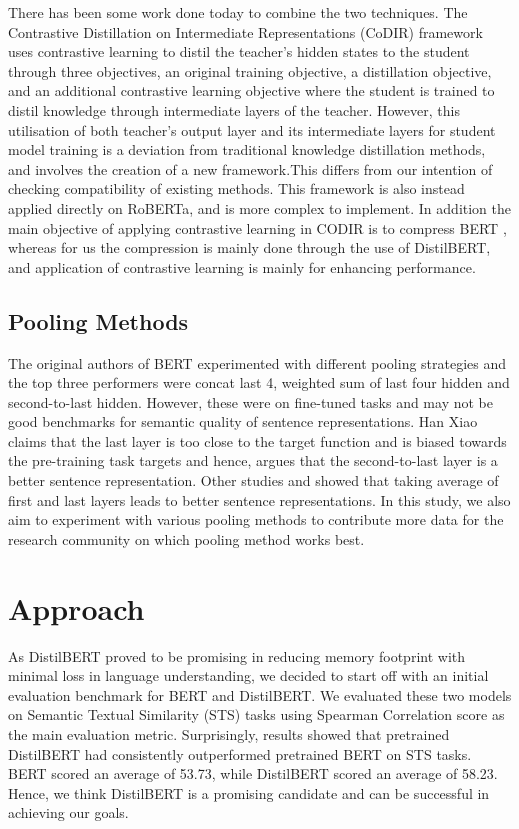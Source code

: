 \documentclass[10pt,twocolumn,letterpaper]{article}
\begin{document}
There has been some work done today to combine the two techniques.  The Contrastive Distillation on Intermediate Representations (CoDIR) framework \cite{2009.14167} uses contrastive learning to distil the teacher’s hidden states to the student through three objectives, an original training objective, a  distillation objective, and an additional contrastive learning objective where the student is trained to distil knowledge through intermediate layers of the teacher. However, this utilisation of both teacher’s output layer and its intermediate layers for student model training is a deviation from traditional knowledge distillation methods, and involves the creation of a new framework.This differs from our intention of checking compatibility of existing methods.  This framework is also instead applied directly on RoBERTa,  and is more complex to implement.  In addition the main objective of applying contrastive learning in CODIR is to compress BERT \cite{2009.14167}, whereas for us the compression is mainly done through the use of DistilBERT, and application of contrastive learning is mainly for enhancing performance.

\subsection{Pooling Methods}

The original authors of BERT \cite{1810.04805} experimented with different pooling strategies and the top three performers were concat last 4, weighted sum of last four hidden and second-to-last hidden. However, these were on fine-tuned tasks and may not be good benchmarks for semantic quality of sentence representations. Han Xiao \cite{bert.as.service} claims that the last layer is too close to the target function and is biased towards the pre-training task targets and hence, argues that the second-to-last layer is a better sentence representation. Other studies \cite{li-etal-2020-sentence} and  \cite{https://doi.org/10.48550/arxiv.1908.10084} showed that taking average of first and last layers leads to better sentence representations. In this study, we also aim to experiment with various pooling methods to contribute more data for the research community on which pooling method works best.

\section{Approach}

As DistilBERT proved to be promising in reducing memory footprint with minimal loss in language understanding, we decided to start off with an initial evaluation benchmark for BERT and DistilBERT. We evaluated these two models on Semantic Textual Similarity (STS) tasks using Spearman Correlation score as the main evaluation metric. Surprisingly, results showed that pretrained DistilBERT had consistently outperformed pretrained BERT on STS tasks. BERT scored an average of 53.73, while DistilBERT scored an average of 58.23. Hence, we think DistilBERT is a promising candidate and can be successful in achieving our goals.
\end{document}
